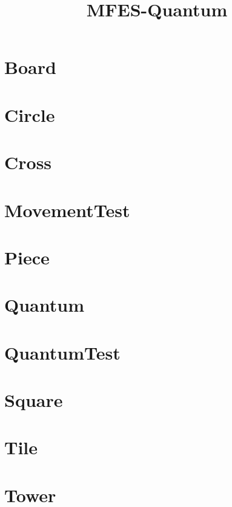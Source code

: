 \documentclass{article}
\begin{document}
\title{MFES-Quantum}
\author{}
\maketitle
\tableofcontents

\section{Board}

\section{Circle}

\section{Cross}

\section{MovementTest}

\section{Piece}

\section{Quantum}

\section{QuantumTest}

\section{Square}

\section{Tile}

\section{Tower}

\end{document}
